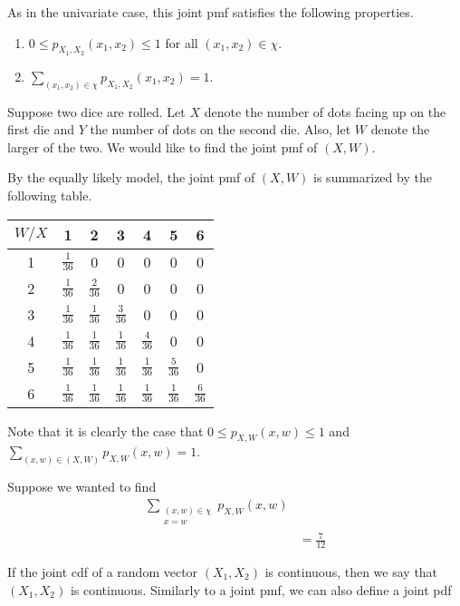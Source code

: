 As in the univariate case, this joint pmf satisfies the following properties.
\begin{enumerate}
	\item $0\leq p_{X_1,X_2}(x_1,x_2)\leq 1$ for all $(x_1,x_2)\in\chi$.
	\item $\sum_{(x_1,x_2)\in\chi}p_{X_1,X_2}(x_1,x_2)=1$.
\end{enumerate}

\begin{example}[]
	Suppose two dice are rolled. Let $X$ denote the number of dots facing up on the first die and $Y$ the number of dots on the second die. Also, let $W$ denote the larger of the two. We would like to find the joint pmf of $(X,W)$.

	By the equally likely model, the joint pmf of $(X,W)$ is summarized by the following table.

	\begin{center}
	\begin{tabular}{c | c c c c c c}
		$W/X$ & 1 & 2 & 3 & 4 & 5 & 6\\\hline
		1 & $\frac{1}{36}$ & 0 & 0 & 0 & 0 & 0\\
		2 & $\frac{1}{36}$ & $\frac{2}{36}$ & 0 & 0 & 0 & 0\\
		3 & $\frac{1}{36}$ & $\frac{1}{36}$ & $\frac{3}{36}$ & 0 & 0 & 0\\
		4 & $\frac{1}{36}$ & $\frac{1}{36}$ & $\frac{1}{36}$ & $\frac{4}{36}$ & 0 & 0\\
		5 & $\frac{1}{36}$ & $\frac{1}{36}$ & $\frac{1}{36}$ & $\frac{1}{36}$ & $\frac{5}{36}$ & 0\\
		6 & $\frac{1}{36}$ & $\frac{1}{36}$ & $\frac{1}{36}$ & $\frac{1}{36}$ & $\frac{1}{36}$ & $\frac{6}{36}$
	\end{tabular}
	\end{center}

	Note that it is clearly the case that $0\leq p_{X,W}(x,w)\leq 1$ and $\sum_{(x,w)\in(X,W)}p_{X,W}(x,w)=1$.

	Suppose we wanted to find 
	\begin{align*}
		\sum_{\substack{(x,w)\in\chi\\x=w}}p_{X,W}(x,w)\\
		&=\frac{7}{12}
	\end{align*}
\end{example}

If the joint cdf of a random vector $(X_1,X_2)$ is continuous, then we say that $(X_1,X_2)$ is continuous. Similarly to a joint pmf, we can also define a joint pdf

